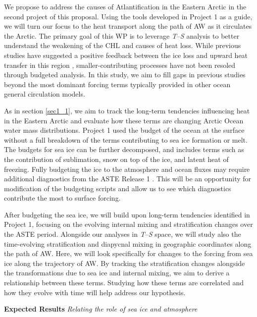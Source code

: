 \documentclass[a4paper,12pt]{article}
\begin{document}
    We propose to address the causes of Atlantification in the Eastern Arctic in the second project of this proposal. Using the tools developed in Project 1 as a guide, we will turn our focus to the heat transport along the path of AW as it circulates the Arctic. The primary goal of this WP is to leverage \emph{T}--\emph{S} analysis to better understand the weakening of the CHL and causes of heat loss. While previous studies have suggested a positive feedback between the ice loss and upward heat transfer in this region , smaller-contributing processes have not been resoled through budgeted analysis. In this study, we aim to fill gaps in previous studies beyond the most dominant forcing terms typically provided in other ocean general circulation models. 

    As in section \ref{sec1_1}, we aim to track the long-term tendencies influencing heat in the Eastern Arctic and evaluate how these terms are changing Arctic Ocean water mass distributions. Project 1 used the budget of the ocean at the surface without a full breakdown of the terms contributing to sea ice formation or melt. The budgets for sea ice can be further decomposed, and includes terms such as the contribution of sublimation, snow on top of the ice, and latent heat of freezing. Fully budgeting the ice to the atmosphere and ocean fluxes may require additional diagnostics from the ASTE Release 1 \cite{Nguyen2021}. This will be an opportunity for modification of the budgeting scripts and allow us to see which diagnostics contribute the most to surface forcing.

    After budgeting the sea ice, we will build upon long-term tendencies identified in Project 1, focusing on the evolving internal mixing and stratification changes over the ASTE period. Alongside our analyses in \emph{T}--\emph{S} space, we will study also the time-evolving stratification and diapycnal mixing in geographic coordinates along the path of AW. Here, we will look specifically for changes to the forcing from sea ice along the trajectory of AW. By tracking the stratification changes alongside the transformations due to sea ice and internal mixing, we aim to derive a relationship between these terms. Studying how these terms are correlated and how they evolve with time will help address our hypothesis.
    
    \begin{tcolorbox}[minipage,colback=columbiablue,arc=10pt,outer arc=10pt]
    \centering
    \textbf{Expected Results}	\emph{Relating the role of sea ice and atmosphere}\label{sec2_2}
    \end{tcolorbox}
\end{document}

